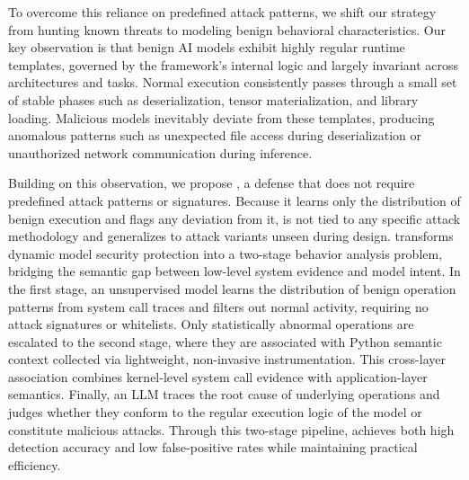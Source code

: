 
To overcome this reliance on predefined attack patterns, we shift our strategy from hunting known threats to modeling benign behavioral characteristics. Our key observation is that benign AI models exhibit highly regular runtime templates, governed by the framework's internal logic and largely invariant across architectures and tasks. Normal execution consistently passes through a small set of stable phases such as deserialization, tensor materialization, and library loading. Malicious models inevitably deviate from these templates, producing anomalous patterns such as unexpected file access during deserialization or unauthorized network communication during inference.

Building on this observation, we propose \toolname{}, a defense that does not require predefined attack patterns or signatures. Because it learns only the distribution of benign execution and flags any deviation from it, \toolname{} is not tied to any specific attack methodology and generalizes to attack variants unseen during design. \toolname{} transforms dynamic model security protection into a two-stage behavior analysis problem, bridging the semantic gap between low-level system evidence and model intent. In the first stage, an unsupervised model learns the distribution of benign operation patterns from system call traces and filters out normal activity, requiring no attack signatures or whitelists. Only statistically abnormal operations are escalated to the second stage, where they are associated with Python semantic context collected via lightweight, non-invasive instrumentation. This cross-layer association combines kernel-level system call evidence with application-layer semantics. Finally, an LLM traces the root cause of underlying operations and judges whether they conform to the regular execution logic of the model or constitute malicious attacks. Through this two-stage pipeline, \toolname{} achieves both high detection accuracy and low false-positive rates while maintaining practical efficiency.


